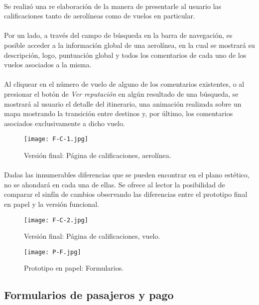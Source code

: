 \documentclass[spanish]{article}
\begin{document}
	\paragraph{} Se realizó una re elaboración de la manera de presentarle al usuario las calificaciones tanto de aerolíneas como de vuelos en particular. 
	\paragraph{} Por un lado, a través del campo de búsqueda en la barra de navegación, es posible acceder a la información global de una aerolínea, en la cual se mostrará su descripción, logo, puntuación global y todos los comentarios de cada uno de los vuelos asociados a la misma. 
	\paragraph{} Al cliquear en el número de vuelo de alguno de los comentarios existentes, o al presionar el botón de \textit{Ver reputación} en algún resultado de una búsqueda, se mostrará al usuario el detalle del itinerario, una animación realizada sobre un mapa mostrando la transición entre destinos y, por último, los comentarios asociados exclusivamente a dicho vuelo.  
				\begin{figure}[h]
					\centering
					\texttt{[image: F-C-1.jpg]}
					\caption{Versión final: Página de calificaciones, aerolínea.}
				\end{figure}
	\paragraph{} Dadas las innumerables diferencias que se pueden encontrar en el plano estético, no se ahondará en cada una de ellas. Se ofrece al lector la posibilidad de comparar el sinfín de cambios observando las diferencias entre el prototipo final en papel y la versión funcional. 
				\begin{figure}[h]
					\centering
					\texttt{[image: F-C-2.jpg]}
					\caption{Versión final: Página de calificaciones, vuelo.}
				\end{figure}
				\newpage
				\begin{figure}[h]
					\centering
					\texttt{[image: P-F.jpg]}
					\caption{Prototipo en papel: Formularios.}
				\end{figure}
	\subsection{Formularios de pasajeros y pago}
\end{document}
